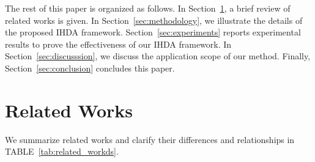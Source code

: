 \documentclass[journal]{IEEEtran}
\begin{document}
The rest of this paper is organized as follows. In Section~\ref{sec:related_works}, a brief review of related works is given. In Section~\ref{sec:methodology}, we illustrate the details of the proposed IHDA framework. Section~\ref{sec:experiments} reports experimental results to prove the effectiveness of our IHDA framework. In Section~\ref{sec:discusssion}, we discuss the application scope of our method. Finally, Section~\ref{sec:conclusion} concludes this paper.


\section{Related Works}
\label{sec:related_works}

We summarize related works and clarify their differences and relationships in TABLE~\ref{tab:related_workds}.
\tabcolsep=4pt
\begin{table}[!ht]
\centering
\caption{A comparison of related works.}
\label{tab:related_workds}
\end{table}
\end{document}
